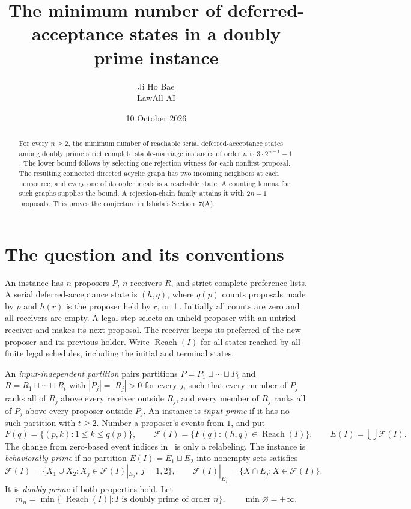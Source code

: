 \documentclass[11pt]{article}
\title{The minimum number of deferred-acceptance states in a doubly prime instance}
\author{Ji Ho Bae\\\small LawAll AI}
\date{10 October 2026}
\newcommand{\Reach}{\operatorname{Reach}}
\begin{document}
\maketitle
\begin{abstract}
For every $n\ge2$, the minimum number of reachable serial
deferred-acceptance states among doubly prime strict complete
stable-marriage instances of order $n$ is $3\cdot2^{n-1}-1$.
The lower bound follows by selecting one rejection witness for each
nonfirst proposal. The resulting connected directed acyclic graph has
two incoming neighbors at each nonsource, and every one of its order
ideals is a reachable state. A counting lemma for such graphs supplies
the bound. A rejection-chain family attains it with $2n-1$ proposals.
This proves the conjecture in Ishida's Section~7(A).
\end{abstract}

\section{The question and its conventions}

An instance has $n$ proposers $P$, $n$ receivers $R$, and strict complete
preference lists. A serial deferred-acceptance state is $(h,q)$, where
$q(p)$ counts proposals made by $p$ and $h(r)$ is the proposer held by
$r$, or $\bot$. Initially all counts are zero and all receivers are empty.
A legal step selects an unheld proposer with an untried receiver and
makes its next proposal. The receiver keeps its preferred of the new
proposer and its previous holder. Write $\Reach(I)$ for all states
reached by all finite legal schedules, including the initial and terminal
states.

An \emph{input-independent partition} pairs partitions
$P=P_1\sqcup\cdots\sqcup P_t$ and $R=R_1\sqcup\cdots\sqcup R_t$ with
$|P_j|=|R_j|>0$ for every $j$, such that every member of $P_j$ ranks all
of $R_j$ above every receiver outside $R_j$, and every member of $R_j$
ranks all of $P_j$ above every proposer outside $P_j$. An instance is
\emph{input-prime} if it has no such partition with $t\ge2$.
Number a proposer's events from $1$, and put
\[
 F(q)=\{(p,k):1\le k\le q(p)\},\qquad
 \mathcal F(I)=\{F(q):(h,q)\in\Reach(I)\},\qquad
 E(I)=\bigcup\mathcal F(I).
\]
The change from zero-based event indices in~\cite{ishida} is only a
relabeling. The instance is \emph{behaviorally prime} if no partition
$E(I)=E_1\sqcup E_2$ into nonempty sets satisfies
\[
 \mathcal F(I)=\{X_1\cup X_2:X_j\in\mathcal F(I)|_{E_j},\ j=1,2\},
 \qquad
 \mathcal F(I)|_{E_j}=\{X\cap E_j:X\in\mathcal F(I)\}.
\]
It is \emph{doubly prime} if both properties hold. Let
\[
 m_n=\min\{|\Reach(I)|: I\text{ is doubly prime of order }n\},
 \qquad \min\varnothing=+\infty.
\]
\end{document}
